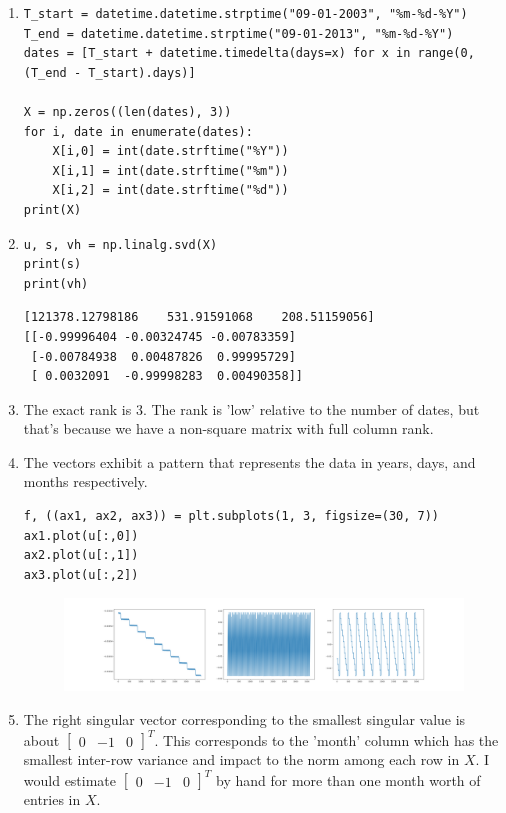 \documentclass[11pt]{article}
\begin{document}
\begin{solution}
\begin{enumerate}
\item
\begin{verbatim}
T_start = datetime.datetime.strptime("09-01-2003", "%m-%d-%Y")
T_end = datetime.datetime.strptime("09-01-2013", "%m-%d-%Y")
dates = [T_start + datetime.timedelta(days=x) for x in range(0, (T_end - T_start).days)]

X = np.zeros((len(dates), 3))
for i, date in enumerate(dates):
    X[i,0] = int(date.strftime("%Y"))
    X[i,1] = int(date.strftime("%m"))
    X[i,2] = int(date.strftime("%d"))
print(X)
\end{verbatim}

\item
\begin{verbatim}
u, s, vh = np.linalg.svd(X)
print(s)
print(vh)
\end{verbatim}
\begin{verbatim}
[121378.12798186    531.91591068    208.51159056]
[[-0.99996404 -0.00324745 -0.00783359]
 [-0.00784938  0.00487826  0.99995729]
 [ 0.0032091  -0.99998283  0.00490358]]
\end{verbatim}

\item The exact rank is 3. The rank is 'low' relative to the number of dates, but that's because we have a non-square matrix with full column rank.

\item The vectors exhibit a pattern that represents the data in years, days, and months respectively.
\begin{verbatim}
f, ((ax1, ax2, ax3)) = plt.subplots(1, 3, figsize=(30, 7))
ax1.plot(u[:,0])
ax2.plot(u[:,1])
ax3.plot(u[:,2])
\end{verbatim}

\begin{figure}[H]
    \centerline{\includegraphics[width=1.2\textwidth]{figs/left_singular_vectors.png}}
\end{figure}

\item The right singular vector corresponding to the smallest singular value is about $\begin{bmatrix} 0 & -1 & 0 \end{bmatrix}^T$. This corresponds to the 'month' column which has the smallest inter-row variance and impact to the norm among each row in $X$. I would estimate $\begin{bmatrix} 0 & -1 & 0\end{bmatrix}^T$ by hand for more than one month worth of entries in $X$.


\end{enumerate}
\end{solution}
\end{document}
